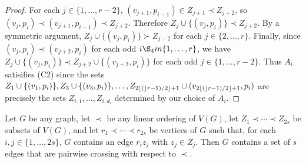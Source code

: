 \documentclass[kpfonts]{patmorin}
\begin{document}
\begin{proof}
    For each $j\in\{1,\ldots,r-2\}$, $(v_{j+1},p_{i-1})\in Z_{j+1}\prec Z_{j+2}$, so  $(v_j,p_i)\prec (v_{j+1},p_{i-1}) \prec Z_{j+2}$.  Therefore $Z_j\cup\{(v_j,p_i)\} \prec Z_{j+2}$.  By a symmetric argument, $Z_j\cup\{(v_j,p_i)\} \succ Z_{j-2}$ for each  $j\in\{2,\ldots,r\}$.  Finally, since $(v_{j},p_i)\prec (v_{j+2},p_i)$ for each odd $i\S_4in\{1,\ldots,r\}$, we have $Z_{j}\cup\{(v_j,p_i)\} \prec Z_{j+2}\cup\{(v_{j+2},p_i)\}$ for each odd $j\in\{1,\ldots,r-2\}$.  Thus $A_i$ satisifies (C2) since the sets $Z_1\cup\{(v_1,p_i)\},Z_3\cup\{(v_3,p_i)\},\ldots,Z_{2{\lfloor ( \rfloor}r-1)/2\rfloor+1} \cup (v_{2{\lfloor ( \rfloor}r-1)/2\rfloor+1},p_i)$ are precisely the sets $Z_{i,1},\ldots,Z_{i,d_i}$ determined by our choice of $A_i$.
\end{proof}

\begin{lem}
    Let $G$ be any graph, let $\prec$ be any linear ordering of $V(G)$,  let $Z_{1}\prec\cdots\prec Z_{2s}$ be subsets of $V(G)$, and let $r_1\prec\cdots\prec r_{2s}$ be vertices of $G$ such that, for each $i,j\in\{1,\ldots,2s\}$, $G$ contains an edge $r_iz_j$ with $z_j\in Z_j$. Then $G$ contains a set of $s$ edges that are pairwise crossing with respect to $\prec$.
\end{lem}
\end{document}
